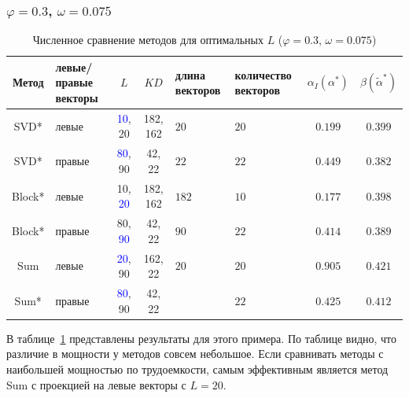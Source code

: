 \documentclass[specialist,
substylefile = spbu_report.rtx,
subf,href,colorlinks=true, 12pt]{disser}
\theoremstyle{definition}
\begin{document}
\subsubsection{$\varphi=0.3$, $\omega=0.075$}

\begin{table}[h]
	\caption{Численное сравнение методов для оптимальных $L$ ($\varphi=0.3$, $\omega=0.075$)}
	\label{tab:res_mc-ssa_phi3}
	\centering
	\begin{tabular}{|c>{\centering\arraybackslash}m{1in}cc>{\centering\arraybackslash}m{1in} >{\centering\arraybackslash}m{1in}cc|}\hline
		Метод & левые/правые векторы & $L$ & $KD$ & длина векторов & количество векторов & $\alpha_I(\alpha^*)$ & $\beta(\widetilde{\alpha}^*)$ \\
		\hline
		SVD* & левые & \textcolor{blue}{10}, 20 & 182, 162 & $20$ & $20$ & $0.199$ & $\mathbf{0.399}$ \\
		\hline
		SVD* & правые & \textcolor{blue}{80}, 90 & 42, 22  & $22$ & $22$ & $0.449$ & $0.382$ \\
		\hline
		Block* & левые & 10, \textcolor{blue}{20} & 182, 162 & $182$ & $10$ & $0.177$ & $\mathbf{0.398}$ \\
		\hline
		Block* & правые & 80, \textcolor{blue}{90} & 42, 22 & $90$ & $22$ & $0.414$ & $0.389$\\
		\hline
		Sum & левые & \textcolor{blue}{20}, 90 & 162, 22 & $20$ & $20$ & $0.905$ & $\mathbf{0.421}$ \\
		\hline
		Sum* & правые & \textcolor{blue}{80}, 90 & 42, 22 & 22 & $22$ & $0.425$ & $\mathbf{0.412}$ \\
		\hline
	\end{tabular}
\end{table}

В таблице~\ref{tab:res_mc-ssa_phi3} представлены результаты для этого примера. По таблице видно, что различие в мощности у методов совсем небольшое. Если сравнивать методы с наибольшей мощностью по трудоемкости, самым эффективным является метод Sum с проекцией на левые векторы с $L=20$.
\end{document}
